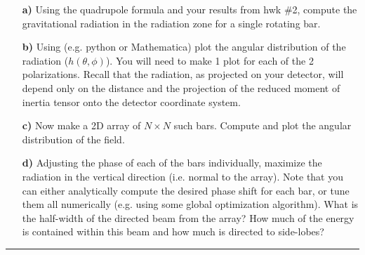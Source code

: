 \documentclass[11pt]{article}
\begin{document}
\begin{enumerate}
\begin{itemize}
\item[\bf a)] Using the quadrupole formula and your results from hwk \#2, compute the gravitational radiation in the radiation zone for a single rotating bar.

\item[\bf b)] Using (e.g. python or Mathematica) plot the angular distribution of the radiation ($h(\theta, \phi)$). You will need to make 1 plot for each of the 2 polarizations. Recall that the radiation, as projected on your detector, will depend only on the distance and the projection of the reduced moment of inertia tensor onto the detector coordinate system.

\item[\bf c)] Now make a 2D array of $N \times N$ such bars. Compute and plot the angular distribution of the field.

\item[\bf d)] Adjusting the phase of each of the bars individually, maximize the radiation in the vertical direction (i.e. normal to the array). Note that you can either analytically compute the desired phase shift for each bar, or tune them all numerically (e.g. using some global optimization algorithm). What is the half-width of the directed beam from the array? How much of the energy is contained within this beam and how much is directed to side-lobes?

\end{itemize}



\end{enumerate}

\bigskip
{\color{Sepia} \hrule}
\end{document}
